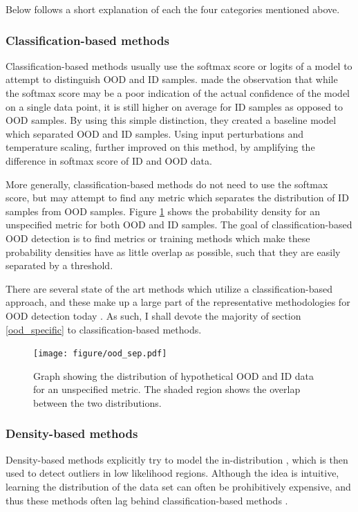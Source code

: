 \documentclass[UKenglish]{uiomasterthesis} %
\theoremstyle{definition}
\begin{document}
Below follows a short explanation of each the four categories mentioned above.
\\

\subsubsection{Classification-based methods}

Classification-based methods usually use the softmax score or logits of a model to attempt to distinguish OOD and ID samples. \cite{oodbaseline} made the observation that while the softmax score may be a poor indication of the actual confidence of the model on a single data point, it is still higher on average for ID samples as opposed to OOD samples. By using this simple distinction, they created a baseline model which separated OOD and ID samples. Using input perturbations and temperature scaling, \cite{odin} further improved on this method, by amplifying the difference in softmax score of ID and OOD data. 

More generally, classification-based methods do not need to use the softmax score, but may attempt to find any metric which separates the distribution of ID samples from OOD samples. Figure \ref{ood_metric} shows the probability density for an unspecified metric for both OOD and ID samples. The goal of classification-based OOD detection is to find metrics or training methods which make these probability densities have as little overlap as possible, such that they are easily separated by a threshold.

There are several state of the art methods which utilize a classification-based approach, and these make up a large part of the representative methodologies for OOD detection today \cite[8]{oodoverview}. As such, I shall devote the majority of section \ref{ood_specific} to classification-based methods.

\begin{figure}[h]
\centerline{\texttt{[image: figure/ood\_sep.pdf]}}
\caption{Graph showing the distribution of hypothetical OOD and ID data for an unspecified metric. The shaded region shows the overlap between the two distributions.}
\label{ood_metric}
\end{figure}


\subsubsection{Density-based methods}

Density-based methods explicitly try to model the in-distribution \cite{oodoverview}, which is then used to detect outliers in low likelihood regions. Although the idea is intuitive, learning the distribution of the data set can often be prohibitively expensive, and thus these methods often lag behind classification-based methods \cite{oodoverview}.
\\
\end{document}
